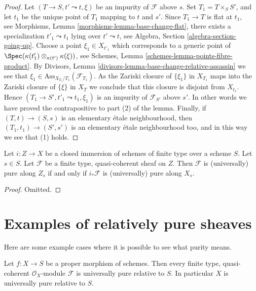 \begin{proof}
Let $(T \to S, t' \leadsto t, \xi)$ be an impurity of
$\mathcal{F}$ above $s$. Set $T_1 = T \times_S S'$, and let $t_1$
be the unique point of $T_1$ mapping to $t$ and $s'$. Since
$T_1 \to T$ is flat at $t_1$, see
Morphisms, Lemma \ref{morphisms-lemma-base-change-flat},
there exists a specialization $t'_1 \leadsto t_1$ lying over
$t' \leadsto t$, see
Algebra, Section \ref{algebra-section-going-up}.
Choose a point $\xi_1 \in X_{t'_1}$ which corresponds to a generic
point of $\Spec(\kappa(t'_1) \otimes_{\kappa(t')} \kappa(\xi))$, see
Schemes, Lemma \ref{schemes-lemma-points-fibre-product}.
By
Divisors, Lemma \ref{divisors-lemma-base-change-relative-assassin}
we see that $\xi_1 \in \text{Ass}_{X_{T_1}/T_1}(\mathcal{F}_{T_1})$.
As the Zariski closure of $\{\xi_1\}$ in $X_{T_1}$ maps into the
Zariski closure of $\{\xi\}$ in $X_T$ we conclude that
this closure is disjoint from $X_{t_1}$. Hence
$(T_1 \to S', t'_1 \leadsto t_1, \xi_1)$
is an impurity of $\mathcal{F}_{S'}$ above $s'$.
In other words we have proved the contrapositive to part (2) of the
lemma. Finally, if $(T, t) \to (S, s)$ is an elementary
\'etale neighbourhood, then $(T_1, t_1) \to (S', s')$ is an
elementary \'etale neighbourhood too, and in this way we see that (1) holds.
\end{proof}

\begin{lemma}
\label{lemma-supported-on-closed}
Let $i : Z \to X$ be a closed immersion of schemes of finite type over
a scheme $S$. Let $s \in S$. Let $\mathcal{F}$ be a
finite type, quasi-coherent sheaf on $Z$. Then $\mathcal{F}$ is
(universally) pure along $Z_s$ if and only if $i_*\mathcal{F}$
is (universally) pure along $X_s$.
\end{lemma}

\begin{proof}
Omitted.
\end{proof}








\section{Examples of relatively pure sheaves}
\label{section-examples-pure-sheaves}

\noindent
Here are some example cases where it is possible to see what purity means.

\begin{lemma}
\label{lemma-proper-pure}
Let $f : X \to S$ be a proper morphism of schemes.
Then every finite type, quasi-coherent $\mathcal{O}_X$-module
$\mathcal{F}$ is universally pure relative to $S$. In particular
$X$ is universally pure relative to $S$.
\end{lemma}

